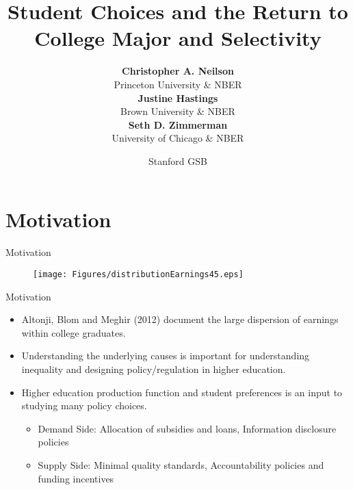 \documentclass[table,10pt]{beamer}
\title[College Major and Selectivity]{Student Choices and the Return to College Major and Selectivity}
\author[Christopher A. Neilson]{\small{   \textbf{Christopher A. Neilson} \\ Princeton University \& NBER \\\vspace{.1in} \textbf{Justine Hastings }\\ Brown University \& NBER\\ \vspace{.1in} \textbf{Seth D. Zimmerman} \\ University of Chicago \& NBER} }
\institute[Princeton University]{ }
\date[Nov 2018]{Stanford GSB}
\begin{document}
\maketitle
\section{Motivation}






\begin{frame}{Motivation}


\begin{figure}
  \centering
  \texttt{[image: Figures/distributionEarnings45.eps]}

\end{figure}

\end{frame}

\begin{frame}{Motivation}

\begin{itemize}

\item<1> Altonji, Blom and Meghir (2012) document the large dispersion of earnings within college graduates. 
\bigskip


\item<2> Understanding the underlying causes is important for understanding inequality and designing policy/regulation in higher education.
\bigskip

\item<3> Higher education \alert{production function} and student \alert{preferences} is an input to studying many policy choices. 
\bigskip

\begin{itemize}
\item<4>[\alert{$\Rightarrow$}] Demand Side: Allocation of subsidies and loans, Information disclosure policies 
\smallskip 
\item<5>[\alert{$\Rightarrow$}] Supply Side: Minimal quality standards, Accountability policies and funding incentives
\end{itemize}


\end{itemize}
\end{frame}
\end{document}
